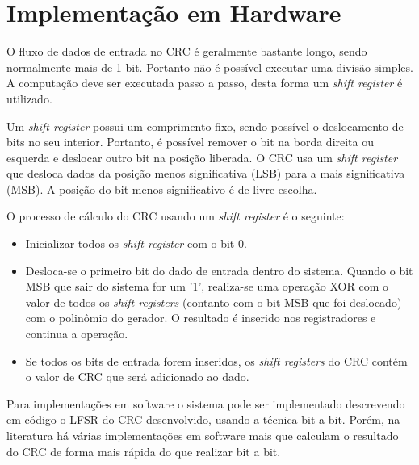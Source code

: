 \section{Implementação em Hardware}

O fluxo de dados de entrada no CRC é geralmente bastante longo, sendo normalmente mais de 1 bit. Portanto não é possível executar uma divisão simples. A computação deve ser executada passo a passo, desta forma um \textit{shift register} é utilizado.

Um \textit{shift register} possui um comprimento fixo, sendo possível o deslocamento de bits no seu interior. Portanto, é possível remover o bit na borda direita ou esquerda e deslocar outro bit na posição liberada. O CRC usa um \textit{shift register} que desloca dados da posição menos significativa (LSB) para a mais significativa (MSB). A posição do bit menos significativo é de livre escolha.

O processo de cálculo do CRC usando um \textit{shift register} é o seguinte:

\begin{itemize}
	\item Inicializar todos os \textit{shift register} com o bit $0$.
	\item Desloca-se o primeiro bit do dado de entrada dentro do sistema. Quando o bit MSB que sair do sistema for um '1', realiza-se uma operação XOR com o valor de todos os \textit{shift registers} (contanto com o bit MSB que foi deslocado) com o polinômio do gerador. O resultado é inserido nos registradores e continua a operação.
	\item Se todos os bits de entrada forem inseridos, os \textit{shift registers} do CRC contém o valor de CRC que será adicionado ao dado.
\end{itemize}

Para implementações em software o sistema pode ser implementado descrevendo em código o LFSR do CRC desenvolvido, usando a técnica bit a bit. Porém, na literatura há várias implementações em software mais que calculam o resultado do CRC de forma mais rápida do que realizar bit a bit.
